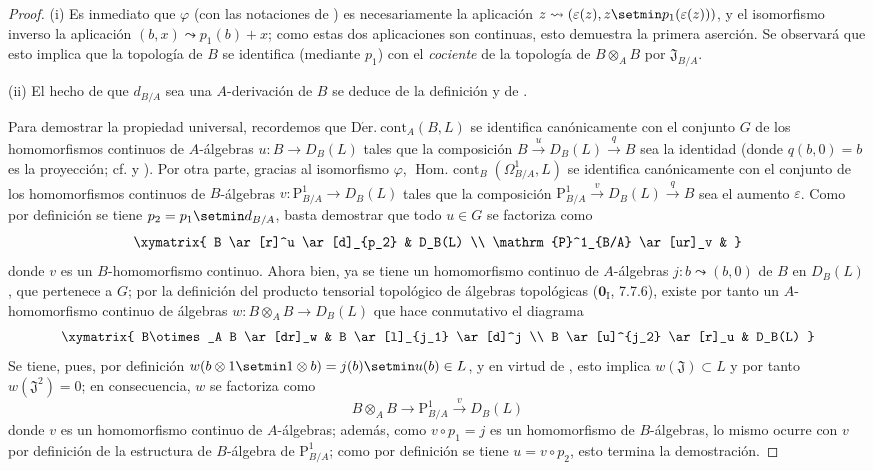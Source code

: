 \begin{proof}
(i) Es inmediato que $\varphi$ (con las notaciones de
) es necesariamente la aplicación
$z\leadsto(\varepsilon(z),z\setmin p_1(\varepsilon(z)))$, y el isomorfismo
inverso la aplicación $(b,x)\leadsto p_1(b)+x$; como estas dos aplicaciones
son continuas, esto demuestra la primera aserción. Se observará que esto
implica que la topología de $B$ se identifica (mediante $p_1$) con el \emph{cociente}
de la topología de $B\otimes_A B$ por $\mathfrak{J}_{B/A}$.

(ii) El hecho de que $d_{B/A}$ sea una $A$-derivación de $B$ se deduce de la
definición  y de .

Para demostrar la propiedad universal, recordemos que
$\operatorname{D\acute{e}r.\ cont}_A(B,L)$ se identifica canónicamente con
el conjunto $G$ de los homomorfismos continuos de $A$-álgebras
$u:B\to D_B(L)$ tales que la composición
$B\xrightarrow{u}D_B(L)\xrightarrow{q}B$ sea la identidad (donde $q(b,0)=b$ es
la proyección; cf.  y ). Por otra parte,
gracias al isomorfismo $\varphi$,
$\operatorname{Hom.\ cont}_B(\Omega^1_{B/A},L)$ se identifica canónicamente con
el conjunto de los homomorfismos continuos de $B$-álgebras
$v:\mathrm{P}^1_{B/A}\to D_B(L)$ tales que la composición
$\mathrm{P}^1_{B/A}\xrightarrow{v}D_B(L)\xrightarrow{q}B$ sea
el aumento $\varepsilon$. Como por definición se tiene $p_2=p_1\setmin d_{B/A}$,
basta demostrar que todo $u\in G$ se factoriza como
\[
\xymatrix{
  B \ar[r]^u \ar[d]_{p_2} & D_B(L) \\
  \mathrm{P}^1_{B/A} \ar[ur]_v &
}
\]
donde $v$ es un $B$-homomorfismo continuo. Ahora bien, ya se tiene un homomorfismo
continuo de $A$-álgebras $j:b\leadsto(b,0)$ de $B$ en $D_B(L)$, que
pertenece a $G$; por la definición del producto tensorial topológico
de álgebras topológicas ($\mathbf{0}_{\mathrm I}$, 7.7.6), existe por tanto un
$A$-homomorfismo continuo de álgebras
$w:B\otimes_A B\to D_B(L)$ que hace conmutativo el diagrama
\[
\xymatrix{
  B\otimes_A B \ar[dr]_w & B \ar[l]_{j_1} \ar[d]^j \\
  B \ar[u]^{j_2} \ar[r]_u & D_B(L)
}
\]
Se tiene, pues, por definición
$w(b\otimes1\setmin 1\otimes b)=j(b)\setmin u(b)\in L$, y en virtud de
, esto implica $w(\mathfrak{J})\subset L$ y por tanto
$w(\mathfrak{J}^2)=0$; en consecuencia, $w$ se factoriza como
\[
  B\otimes_A B\to\mathrm{P}^1_{B/A}\xrightarrow{v}D_B(L)
\]
donde $v$ es un homomorfismo continuo de $A$-álgebras; además, como
$v\circ p_1=j$ es un homomorfismo de $B$-álgebras, lo mismo ocurre con
$v$ por definición de la estructura de $B$-álgebra de
$\mathrm{P}^1_{B/A}$; como por definición se tiene $u=v\circ p_2$, esto
termina la demostración.
\end{proof}

